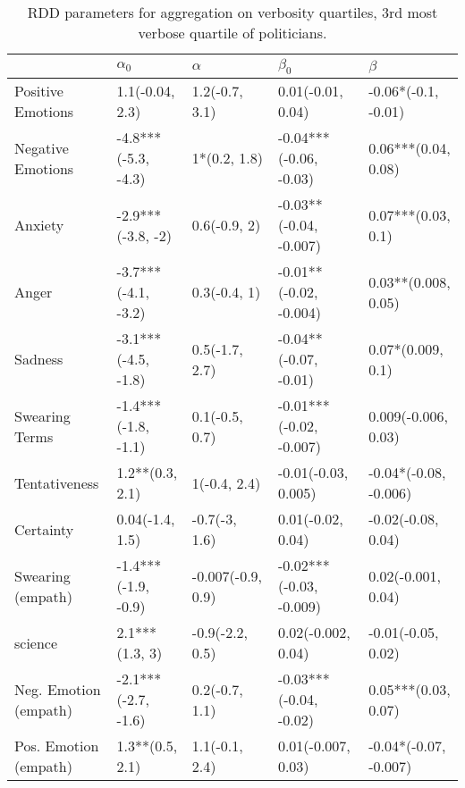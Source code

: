 \begin{table}[h]\centering
\caption{RDD parameters for aggregation on verbosity quartiles, 3rd most verbose quartile of politicians.}
	\label{fig: Verbosity_5}
\begin{adjustbox}{width=\linewidth, center}
	\begin{tabular}{lllll}
	\toprule
	{} &           $\alpha_0$ &           $\alpha$ &                $\beta_0$ &                $\beta$ \\
	\midrule
	Positive Emotions     &      1.1(-0.04, 2.3) &     1.2(-0.7, 3.1) &        0.01(-0.01, 0.04) &    -0.06*(-0.1, -0.01) \\
	Negative Emotions     &  -4.8***(-5.3, -4.3) &       1*(0.2, 1.8) &   -0.04***(-0.06, -0.03) &    0.06***(0.04, 0.08) \\
	Anxiety               &    -2.9***(-3.8, -2) &       0.6(-0.9, 2) &   -0.03**(-0.04, -0.007) &     0.07***(0.03, 0.1) \\
	Anger                 &  -3.7***(-4.1, -3.2) &       0.3(-0.4, 1) &   -0.01**(-0.02, -0.004) &    0.03**(0.008, 0.05) \\
	Sadness               &  -3.1***(-4.5, -1.8) &     0.5(-1.7, 2.7) &    -0.04**(-0.07, -0.01) &      0.07*(0.009, 0.1) \\
	Swearing Terms        &  -1.4***(-1.8, -1.1) &     0.1(-0.5, 0.7) &  -0.01***(-0.02, -0.007) &    0.009(-0.006, 0.03) \\
	Tentativeness         &      1.2**(0.3, 2.1) &       1(-0.4, 2.4) &      -0.01(-0.03, 0.005) &  -0.04*(-0.08, -0.006) \\
	Certainty             &      0.04(-1.4, 1.5) &      -0.7(-3, 1.6) &        0.01(-0.02, 0.04) &     -0.02(-0.08, 0.04) \\
	Swearing (empath)     &  -1.4***(-1.9, -0.9) &  -0.007(-0.9, 0.9) &  -0.02***(-0.03, -0.009) &     0.02(-0.001, 0.04) \\
	science               &       2.1***(1.3, 3) &    -0.9(-2.2, 0.5) &       0.02(-0.002, 0.04) &     -0.01(-0.05, 0.02) \\
	Neg. Emotion (empath) &  -2.1***(-2.7, -1.6) &     0.2(-0.7, 1.1) &   -0.03***(-0.04, -0.02) &    0.05***(0.03, 0.07) \\
	Pos. Emotion (empath) &      1.3**(0.5, 2.1) &     1.1(-0.1, 2.4) &       0.01(-0.007, 0.03) &  -0.04*(-0.07, -0.007) \\
	\bottomrule
	\end{tabular}
	
\end{adjustbox}
	\end{table}

